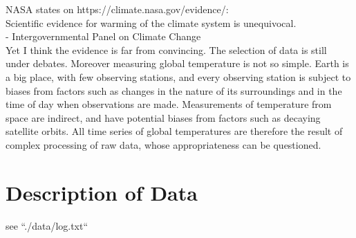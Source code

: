 \documentclass[11pt,a4paper]{paper}
\begin{document}
NASA states on https://climate.nasa.gov/evidence/:\\
Scientific evidence for warming of the climate system is unequivocal. \\
\indent  \quad - Intergovernmental Panel on Climate Change\\
\indent Yet I think the evidence is far from convincing. The selection of data is still under debates. Moreover measuring global temperature is not so simple.  Earth is a big place, with few observing stations, and every observing station is subject to biases from factors such as changes in the nature of its surroundings and in the time of day when observations are made. Measurements of temperature from space are indirect, and have potential biases from factors such as decaying satellite orbits.  All time series of global temperatures are therefore the result of complex processing of raw data, whose appropriateness can be questioned. \\






\section{Description of Data}
see ``./data/log.txt``
\end{document}
